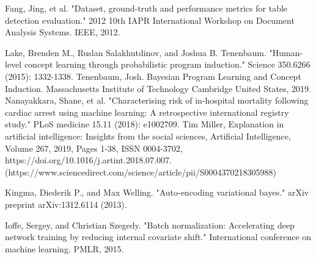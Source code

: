\documentclass{JMLFS}
\begin{document}
\begin{thebibliography}{99}
Fang, Jing, et al. "Dataset, ground-truth and performance metrics for table detection evaluation." 2012 10th IAPR International Workshop on Document Analysis Systems. IEEE, 2012.

 Lake, Brenden M., Ruslan Salakhutdinov, and Joshua B. Tenenbaum. "Human-level concept learning through probabilistic program induction." Science 350.6266 (2015): 1332-1338.
Tenenbaum, Josh. Bayesian Program Learning and Concept Induction. Massachusetts Institute of Technology Cambridge United States, 2019.
 Nanayakkara, Shane, et al. "Characterising risk of in-hospital mortality following cardiac arrest using machine learning: A retrospective international registry study." PLoS medicine 15.11 (2018): e1002709.
 Tim Miller, Explanation in artificial intelligence: Insights from the social sciences, Artificial Intelligence, Volume 267,
2019, Pages 1-38,  ISSN 0004-3702, https://doi.org/10.1016/j.artint.2018.07.007. (https://www.sciencedirect.com/science/article/pii/S0004370218305988)

 Kingma, Diederik P., and Max Welling. "Auto-encoding variational bayes." arXiv preprint arXiv:1312.6114 (2013).

 Ioffe, Sergey, and Christian Szegedy. "Batch normalization: Accelerating deep network training by reducing internal covariate shift." International conference on machine learning. PMLR, 2015.

\end{thebibliography}
\end{document}
